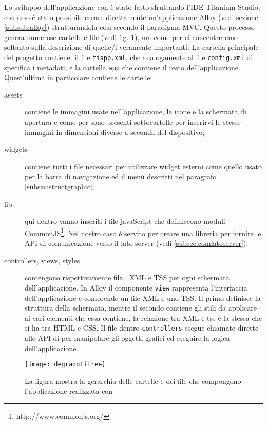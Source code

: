 			Lo sviluppo dell'applicazione con \tisdk{} è stato fatto sfruttando 
			l'IDE Titanium Studio, con esso è stato possibile creare direttamente 
			un'applicazione Alloy (vedi sezione \ref{subsub:alloy}) strutturandola 
			così secondo il paradigma MVC.
			Questo processo genera numerose cartelle e file (vedi fig. \ref{fig:degradoTiTree}), 
			ma come per \pg{} ci concentreremo soltanto sulla descrizione di quelle/i veramente importanti.
			La cartella principale del progetto contiene: il file \texttt{tiapp.xml}, che 
			analogamente al file \texttt{config.xml} di \pg{} specifica i metadati, e 
			la cartella \texttt{app} che contiene il resto dell'applicazione.
			Quest'ultima in particolare contiene le cartelle: 
			\begin{description}
				\item[assets] contiene le immagini usate nell'applicazione, le 
							  icone e la schermata di apertura e come per \pg{} 
							  sono presenti sottocartelle per inserirvi le stesse 
							  immagini in dimensioni diverse a seconda del dispositivo;
				\item[widgets] contiene tutti i file necessari per utilizzare widget esterni 
							   come quello usato per la barra di navigazione ed il menù descritti 
							   nel paragrafo \ref{subsec:structgraphic};
				\item[lib] qui dentro vanno inseriti i file javaScript che definiscono 
						   moduli CommonJS\footnote{http://www.commonjs.org/}. Nel 
						   nostro caso è servito per creare una libreria per fornire 
						   le API di comunicazione verso il lato server (vedi \ref{subsec:comlatoserver});
				\item[controllers, views, styles] contengono rispettivamente file 
							\js{}, XML e TSS per ogni schermata dell'applicazione. 
							In Alloy il componente \texttt{view} rappresenta l'interfaccia 
							dell'applicazione e comprende un file XML e uno TSS. 
							Il primo definisce la struttura della schermata, mentre il 
							secondo contiene gli stili da applicare ai vari elementi 
							che essa contiene, la relazione tra XML e tss è la stessa
							che si ha tra HTML e CSS.
							Il file dentro \texttt{controllers} esegue chiamate dirette 
							alle API di \tisdk{} per manipolare gli oggetti grafici 
							ed eseguire la logica dell'applicazione.
			\end{description}
			
			\begin{figure}[h]
				\centering
				\texttt{[image: degradoTiTree]}
				\caption{
				La figura mostra la gerarchia delle cartelle e dei file che 
				compongono l'applicazione realizzata con \tisdk{}
				}
				\label{fig:degradoTiTree}
			\end{figure}
			
